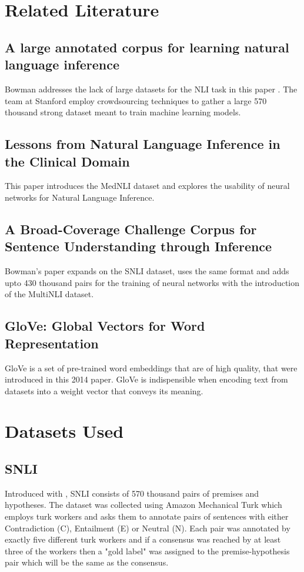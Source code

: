 \documentclass[12pt, conference]{IEEEtran}
\begin{document}
\section{Related Literature}

\subsection{A large annotated corpus for learning natural language inference}
Bowman addresses the lack of large datasets for the NLI task in this paper \cite{b1}. The team at Stanford employ crowdsourcing techniques to gather a large 570 thousand strong dataset meant to train machine learning models.

\subsection{Lessons from Natural Language Inference in the Clinical Domain}
This paper\cite{b2} introduces the MedNLI dataset and explores the usability of neural networks for Natural Language Inference.

\subsection{A Broad-Coverage Challenge Corpus for
Sentence Understanding through Inference}
Bowman's paper \cite{b3} expands on the SNLI dataset, uses the same format and adds upto 430 thousand pairs for the training of neural networks with the introduction of the MultiNLI dataset.

\subsection{GloVe: Global Vectors for Word Representation}
GloVe is a set of pre-trained word embeddings that are of high quality, that were introduced in this 2014 paper\cite{b4}. GloVe is indispensible when encoding text from datasets into a weight vector that conveys its meaning.

\section{Datasets Used}

\subsection{SNLI}
Introduced with \cite{b1}, SNLI consists of 570 thousand pairs of premises and hypotheses. The dataset was collected using Amazon Mechanical Turk which employs turk workers and asks them to annotate pairs of sentences with either Contradiction (C), Entailment (E) or Neutral (N). Each pair was annotated by exactly five different turk workers and if a consensus was reached by at least three of the workers then a "gold label" was assigned to the premise-hypothesis pair which will be the same as the consensus.
\end{document}
